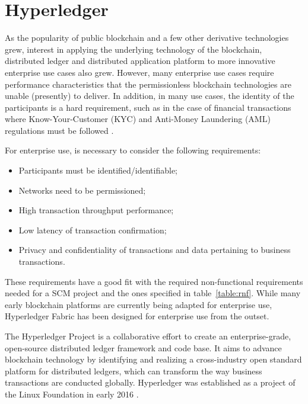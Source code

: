 \section{Hyperledger}\label{sec:hyperledger}

As the popularity of public blockchain and a few other derivative technologies grew, interest in applying the underlying technology of the blockchain, distributed ledger and distributed application platform to more innovative enterprise use cases also grew. However, many enterprise use cases require performance characteristics that the permissionless blockchain technologies are unable (presently) to deliver. In addition, in many use cases, the identity of the participants is a hard requirement, such as in the case of financial transactions where Know-Your-Customer (KYC) and Anti-Money Laundering (AML) regulations must be followed \cite{POLGE2020}.

For enterprise use, is necessary to consider the following requirements:

\begin{itemize}
\item Participants must be identified/identifiable;
\item Networks need to be permissioned;
\item High transaction throughput performance;
\item Low latency of transaction confirmation;
\item Privacy and confidentiality of transactions and data pertaining to business transactions.
\end{itemize}

These requirements have a good fit with the required non-functional requirements needed for a SCM project and the ones specified in table~\ref{table:rnf}. While many early blockchain platforms are currently being adapted for enterprise use, Hyperledger Fabric has been designed for enterprise use from the outset. 

The Hyperledger Project is a collaborative effort to create an enterprise-grade, open-source distributed ledger framework and code base. It aims to advance blockchain technology by identifying and realizing a cross-industry open standard platform for distributed ledgers, which can transform the way business transactions are conducted globally. Hyperledger was established as a project of the Linux Foundation in early 2016 \cite{cachin2016architecture}.

